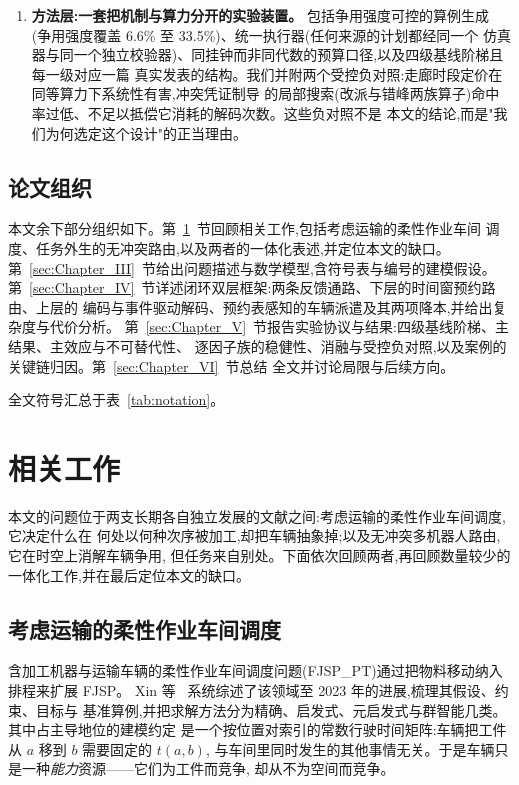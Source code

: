 \documentclass[manuscript,screen,review]{acmart}
\newcommand{\ContentionLo}{6.6\%}
\newcommand{\ContentionHi}{33.5\%}
\begin{document}
\begin{enumerate}[leftmargin=*]
\item \textbf{方法层:一套把机制与算力分开的实验装置。} 包括争用强度可控的算例生成
(争用强度覆盖 \ContentionLo{} 至 \ContentionHi{})、统一执行器(任何来源的计划都经同一个
仿真器与同一个独立校验器)、同挂钟而非同代数的预算口径,以及四级基线阶梯且每一级对应一篇
真实发表的结构。我们并附两个受控负对照:走廊时段定价在同等算力下系统性有害,冲突凭证制导
的局部搜索(改派与错峰两族算子)命中率过低、不足以抵偿它消耗的解码次数。这些负对照不是
本文的结论,而是"我们为何选定这个设计"的正当理由。

\end{enumerate}

\subsection{论文组织}

本文余下部分组织如下。第~\ref{sec:Chapter_II}~节回顾相关工作,包括考虑运输的柔性作业车间
调度、任务外生的无冲突路由,以及两者的一体化表述,并定位本文的缺口。
第~\ref{sec:Chapter_III}~节给出问题描述与数学模型,含符号表与编号的建模假设。
第~\ref{sec:Chapter_IV}~节详述闭环双层框架:两条反馈通路、下层的时间窗预约路由、上层的
编码与事件驱动解码、预约表感知的车辆派遣及其两项降本,并给出复杂度与代价分析。
第~\ref{sec:Chapter_V}~节报告实验协议与结果:四级基线阶梯、主结果、主效应与不可替代性、
逐因子族的稳健性、消融与受控负对照,以及案例的关键链归因。第~\ref{sec:Chapter_VI}~节总结
全文并讨论局限与后续方向。

全文符号汇总于表~\ref{tab:notation}。



\section{相关工作}
\label{sec:Chapter_II}

本文的问题位于两支长期各自独立发展的文献之间:考虑运输的柔性作业车间调度,它决定什么在
何处以何种次序被加工,却把车辆抽象掉;以及无冲突多机器人路由,它在时空上消解车辆争用,
但任务来自别处。下面依次回顾两者,再回顾数量较少的一体化工作,并在最后定位本文的缺口。

\subsection{考虑运输的柔性作业车间调度}

含加工机器与运输车辆的柔性作业车间调度问题(FJSP\_PT)通过把物料移动纳入排程来扩展 FJSP。
Xin 等~\cite{xin2025review} 系统综述了该领域至 2023 年的进展,梳理其假设、约束、目标与
基准算例,并把求解方法分为精确、启发式、元启发式与群智能几类。其中占主导地位的建模约定
是一个按位置对索引的常数行驶时间矩阵:车辆把工件从 $a$ 移到 $b$ 需要固定的 $t(a,b)$,
与车间里同时发生的其他事情无关。于是车辆只是一种\emph{能力}资源——它们为工件而竞争,
却从不为空间而竞争。
\end{document}
